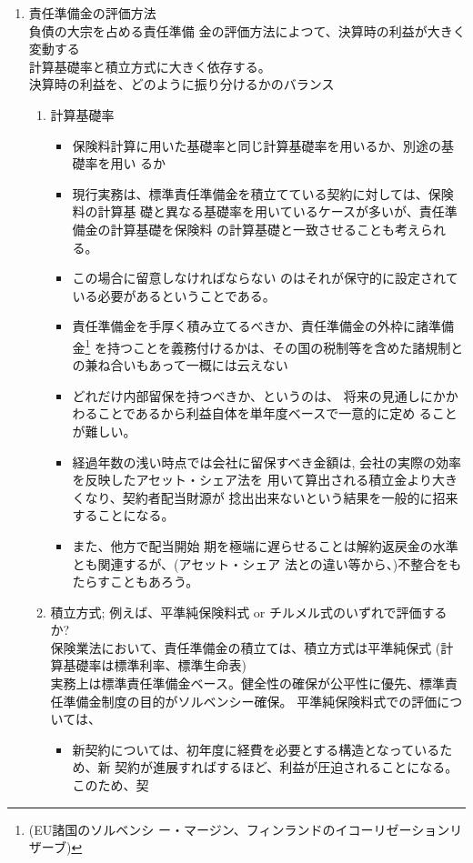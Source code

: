 \documentclass[report,gutter=10mm,fore-edge=10mm,uplatex,dvipdfmx]{jlreq}
\begin{document}
\begin{enumerate}
\begin{enumerate}
 \item 責任準備金の評価方法\\
負債の大宗を占める責任準備
金の評価方法によつて、決算時の利益が大きく変動する\\
計算基礎率と積立方式に大きく依存する。\\
決算時の利益を、どのように振り分けるかのバランス
\begin{enumerate}
 \item 計算基礎率
\begin{itemize}
 \item 保険料計算に用いた基礎率と同じ計算基礎率を用いるか、別途の基礎率を用い
るか
 \item 現行実務は、標準責任準備金を積立てている契約に対しては、保険料の計算基
礎と異なる基礎率を用いているケースが多いが、責任準備金の計算基礎を保険料
の計算基礎と一致させることも考えられる。
 \item この場合に留意しなければならない
のはそれが保守的に設定されている必要があるということである。
 \item 責任準備金を手厚く積み立てるべきか、責任準備金の外枠に諸準備金\footnote{(EU諸国のソルベンシ
ー・マージン、フィンランドのイコーリゼーションリザーブ)}
を持つことを義務付けるかは、その国の税制等を含めた諸規制との兼ね合いもあって一概には云えない
 \item どれだけ内部留保を持つべきか、というのは、
将来の見通しにかかわることであるから利益自体を単年度ベースで一意的に定め
ることが難しい。
 \item 経過年数の浅い時点では会社に留保すべき金額は, 会社の実際の効率を反映したアセット・シェア法を
用いて算出される積立金より大きくなり、契約者配当財源が
捻出出来ないという結果を一般的に招来することになる。
 \item また、他方で配当開始
期を極端に遅らせることは解約返戻金の水準とも関連するが、(アセット・シェア
法との違い等から、)不整合をもたらすこともあろう。
\end{itemize}
 \item 積立方式; 例えば、平準純保険料式 or チルメル式のいずれで評価するか?\\
保険業法において、責任準備金の積立ては、積立方式は平準純保式 (計算基礎率は標準利率、標準生命表)\\
実務上は標準責任準備金ベース。健全性の確保が公平性に優先、標準責任準備金制度の目的がソルベンシー確保。
平準純保険料式での評価については、
\begin{itemize}
 \item 新契約については、初年度に経費を必要とする構造となっているため、新
契約が進展すればするほど、利益が圧迫されることになる。このため、契

\end{itemize}
\end{enumerate}
\end{enumerate}
\end{enumerate}
\end{document}
